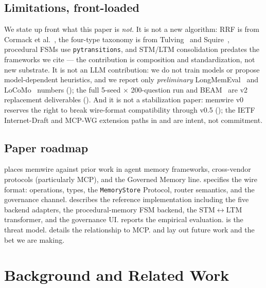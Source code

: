 \documentclass[11pt,letterpaper,twocolumn]{article}
\begin{document}
\subsection{Limitations, front-loaded}
\label{sec:intro-limitations}

We state up front what this paper is \emph{not}. It is not a new algorithm: RRF is from Cormack et al.~\cite{cormack2009rrf}, the four-type taxonomy is from Tulving~\cite{tulving1972episodic} and Squire~\cite{squire1992declarative}, procedural FSMs use \texttt{pytransitions}, and STM/LTM consolidation predates the frameworks we cite --- the contribution is composition and standardization, not new substrate. It is not an LLM contribution: we do not train models or propose model-dependent heuristics, and we report only \emph{preliminary} LongMemEval~\cite{wu2024longmemeval} and LoCoMo~\cite{maharana2024locomo} numbers (); the full 5-seed $\times$ 200-question run and BEAM~\cite{beam_benchmark} are v2 replacement deliverables (). And it is not a stabilization paper: memwire v0 reserves the right to break wire-format compatibility through v0.5 (); the IETF Internet-Draft and MCP-WG extension paths in  and  are intent, not commitment.

\subsection{Paper roadmap}
\label{sec:intro-roadmap}

 places memwire against prior work in agent memory frameworks, cross-vendor protocols (particularly MCP), and the Governed Memory line.  specifies the wire format: operations, types, the \texttt{MemoryStore} Protocol, router semantics, and the governance channel.  describes the reference implementation including the five backend adapters, the procedural-memory FSM backend, the STM$\leftrightarrow$LTM transformer, and the governance UI.  reports the empirical evaluation.  is the threat model.  details the relationship to MCP.  and  lay out future work and the bet we are making.

\section{Background and Related Work}
\label{sec:related}
\end{document}
